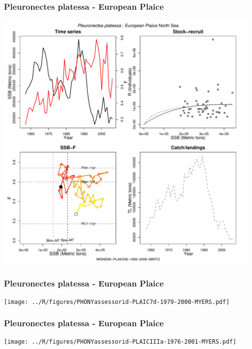 \subsubsection{Pleuronectes platessa - European Plaice}
\begin{center}
\includegraphics[width=1.2\textwidth]{../R/figures/WGNSSK-PLAICNS-1956-2006-MINTO.pdf}
\end{center}

\subsubsection{Pleuronectes platessa - European Plaice}
\begin{center}
\texttt{[image: ../R/figures/PHONYassessorid-PLAIC7d-1979-2000-MYERS.pdf]}
\end{center}

\subsubsection{Pleuronectes platessa - European Plaice}
\begin{center}
\texttt{[image: ../R/figures/PHONYassessorid-PLAICIIIa-1976-2001-MYERS.pdf]}
\end{center}

